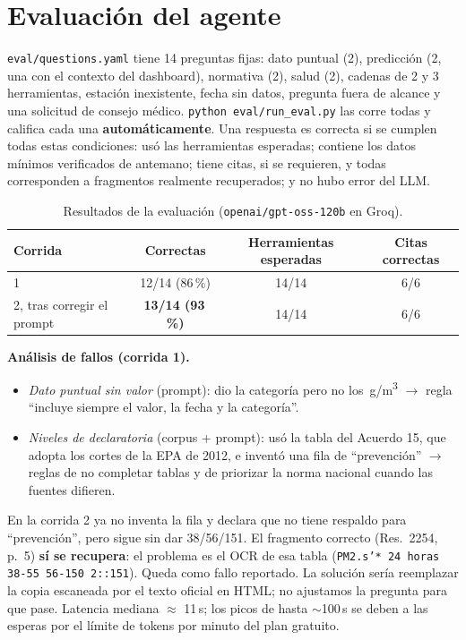 \documentclass[10pt,a4paper]{article}
\newcommand{\ugm}{\,\textmu g/m\textsuperscript{3}}
\newcommand{\code}[1]{\texttt{\small #1}}
\begin{document}
\section{Evaluación del agente}
\code{eval/questions.yaml} tiene 14 preguntas fijas: dato puntual (2), predicción (2, una con el
contexto del dashboard), normativa (2), salud (2), cadenas de 2 y 3 herramientas, estación inexistente,
fecha sin datos, pregunta fuera de alcance y una solicitud de consejo médico. \code{python eval/run\_eval.py}
las corre todas y califica cada una \textbf{automáticamente}. Una respuesta es correcta si se cumplen
todas estas condiciones: usó las herramientas esperadas; contiene los datos mínimos verificados de
antemano; tiene citas, si se requieren, y todas corresponden a fragmentos realmente recuperados; y no
hubo error del LLM.

\begin{table}[h]
\centering\small
\caption{Resultados de la evaluación (\code{openai/gpt-oss-120b} en Groq).}
\begin{tabular}{lccc}
\toprule
Corrida & Correctas & Herramientas esperadas & Citas correctas \\
\midrule
1                          & 12/14 (86\,\%) & 14/14 & 6/6 \\
2, tras corregir el prompt & \textbf{13/14 (93\,\%)} & 14/14 & 6/6 \\
\bottomrule
\end{tabular}
\end{table}

\textbf{Análisis de fallos (corrida 1).}
\begin{itemize}
  \item \textit{Dato puntual sin valor} (prompt): dio la categoría pero no los \ugm{} $\rightarrow$ regla
    ``incluye siempre el valor, la fecha y la categoría''.
  \item \textit{Niveles de declaratoria} (corpus + prompt): usó la tabla del Acuerdo 15, que adopta los
    cortes de la EPA de 2012, e inventó una fila de ``prevención'' $\rightarrow$ reglas de no completar
    tablas y de priorizar la norma nacional cuando las fuentes difieren.
\end{itemize}
En la corrida 2 ya no inventa la fila y declara que no tiene respaldo para ``prevención'', pero sigue
sin dar 38/56/151. El fragmento correcto (Res.~2254, p.~5) \textbf{sí se recupera}: el problema es el
OCR de esa tabla (\code{PM2.s'* 24 horas 38-55 56-150 2::151}). Queda como fallo reportado. La solución
sería reemplazar la copia escaneada por el texto oficial en HTML; no ajustamos la pregunta para que pase.
Latencia mediana $\approx$ 11\,s; los picos de hasta $\sim$100\,s se deben a las esperas por el límite de
tokens por minuto del plan gratuito.
\end{document}
